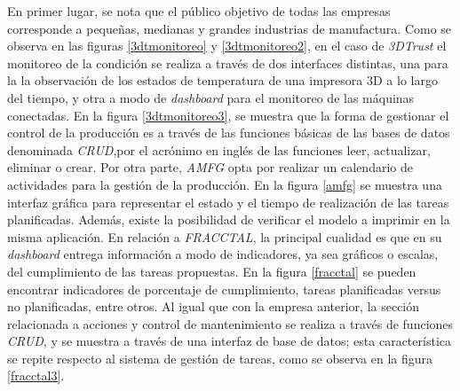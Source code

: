 En primer lugar, se nota que el público objetivo de todas las empresas corresponde a pequeñas, medianas y grandes industrias de manufactura. Como se observa en las figuras \ref{3dtmonitoreo} y \ref{3dtmonitoreo2}, en el caso de \textit{3DTrust} el monitoreo de la condición se realiza a través de dos interfaces distintas, una para la la observación de los estados de temperatura de una impresora 3D a lo largo del tiempo, y otra a modo de \textit{dashboard} para el monitoreo de las máquinas conectadas. En la figura \ref{3dtmonitoreo3}, se muestra que la forma de gestionar el control de la producción es a través de las funciones básicas de las bases de datos denominada \textit{CRUD},por el acrónimo en inglés de las funciones leer, actualizar, eliminar o crear. Por otra parte, \textit{AMFG} opta por realizar un calendario de actividades para la gestión de la producción. En la figura \ref{amfg} se muestra una interfaz gráfica para representar el estado y el tiempo de realización de las tareas planificadas. Además, existe la posibilidad de verificar el modelo a imprimir en la misma aplicación. En relación a \textit{FRACCTAL}, la principal cualidad es que en su \textit{dashboard} entrega información a modo de indicadores, ya sea gráficos o escalas, del cumplimiento de las tareas propuestas. En la figura \ref{fracctal} se pueden encontrar indicadores de porcentaje de cumplimiento, tareas planificadas versus no planificadas, entre otros. Al igual que con la empresa anterior, la sección relacionada a acciones y control de mantenimiento se realiza a través de funciones \textit{CRUD}, y se muestra a través de una interfaz de base de datos; esta característica se repite respecto al sistema de gestión de tareas, como se observa en la figura \ref{fracctal3}.


